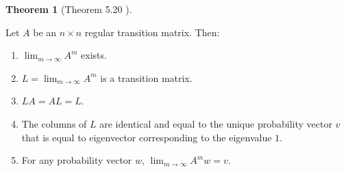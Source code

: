 \documentclass{amsart}
\theoremstyle{definition}
\newtheorem{theorem}{Theorem}
\theoremstyle{remark}
\numberwithin{equation}{section}
\begin{document}
\begin{theorem}[Theorem 5.20 \cite{friedberg2003linear}] \label{theorem520}

Let $A$ be an $n \times n$ regular transition matrix. Then:

\begin{enumerate} 


	\item $\lim_{m \to \infty} A^m$ exists.

	\item $L = \lim_{m \to \infty} A^m$ is a transition matrix.

	\item $LA = AL = L$.

	\item The columns of $L$ are identical and equal to the unique probability vector $v$ that is equal to eigenvector corresponding to the eigenvalue $1$.

	\item For any probability vector $w$, $\lim_{m \to \infty} A^m w = v$.

\end{enumerate}

\end{theorem}
\end{document}

